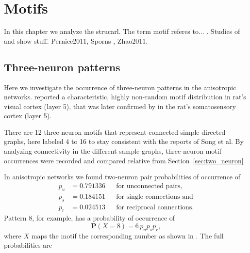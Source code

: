 
\newpage
\section{Motifs}

In this chapter we analyze the strucarl. The term motif referes
to... . Studies of \textcite{Song2005} and \textcite{Perin2011} show
stuff. Pernice2011, Sporns , Zhao2011.


\subsection*{Three-neuron patterns}

Here we investigate the occurrence of three-neuron patterns in the
anisotropic networks. \textcite{Song2005} reported a characteristic,
highly non-random motif distribution in rat's visual cortex (layer 5),
that was later confirmed by \textcite{Perin2011} in the rat's
somatosensory cortex (layer 5). 

There are 12 three-neuron motifs that represent connected simple
directed graphs, here labeled 4 to 16 to stay consistent with the
reports of Song et al. By analyzing connectivity in the different
sample graphs, three-neuron motif occurrences were recorded and
compared relative from Section~\ref{sec:two_neuron}

In anisotropic networks we found two-neuron pair probabilities of
occurrence of
\begin{align*} 
p_u & = 0.791336     &&\text{for unconnected pairs,}  \\
p_s & = 0.184151 &&\text{for single connections and}\\
p_r & = 0.024513  &&\text{for reciprocal connections.}
\end{align*}
Pattern 8, for example, has a probability of occurrence of 
\[
\mathbf{P}(X=8) = 6\, p_{u} p_{s} p_{r},
\]
where $X$ maps the motif the corresponding number as shown in . The
full probabilities are

